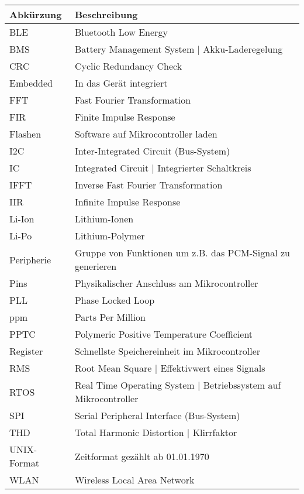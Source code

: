 ﻿\begin{table}[H]
    \centering
    \begin{tabular}{|l|l|}
    \hline
        \textbf{Abkürzung} & \textbf{Beschreibung} \\ \hline
        BLE & Bluetooth Low Energy \\ \hline
        BMS & Battery Management System $\vert$ Akku-Laderegelung \\ \hline
        CRC & Cyclic Redundancy Check \\ \hline
        Embedded & In das Gerät integriert \\ \hline
        FFT & Fast Fourier Transformation \\ \hline
        FIR & Finite Impulse Response \\ \hline
        Flashen & Software auf Mikrocontroller laden \\ \hline
        I2C & Inter-Integrated Circuit (Bus-System) \\ \hline
        IC & Integrated Circuit $\vert$ Integrierter Schaltkreis \\ \hline
        IFFT & Inverse Fast Fourier Transformation \\ \hline
        IIR & Infinite Impulse Response \\ \hline
        Li-Ion & Lithium-Ionen \\ \hline
        Li-Po & Lithium-Polymer \\ \hline
        Peripherie & Gruppe von Funktionen um z.B. das PCM-Signal zu generieren \\ \hline
        Pins & Physikalischer Anschluss am Mikrocontroller \\ \hline
        PLL & Phase Locked Loop \\ \hline
        ppm & Parts Per Million \\ \hline
        PPTC & Polymeric Positive Temperature Coefficient \\ \hline
        Register & Schnellste Speichereinheit im Mikrocontroller \\ \hline
        RMS & Root Mean Square $\vert$ Effektivwert eines Signals \\ \hline
		RTOS & Real Time Operating System $\vert$ Betriebssystem auf Mikrocontroller \\ \hline
        SPI & Serial Peripheral Interface (Bus-System) \\ \hline
        THD & Total Harmonic Distortion $\vert$ Klirrfaktor \\ \hline
        UNIX-Format & Zeitformat gezählt ab 01.01.1970 \\ \hline
        WLAN & Wireless Local Area Network \\ \hline
    \end{tabular}
\end{table}